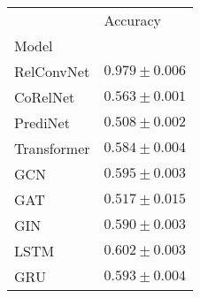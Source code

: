 \begin{tabular}{ll}
\toprule
{} &           Accuracy \\
Model       &                    \\
\midrule
RelConvNet  &  $0.979 \pm 0.006$ \\
CoRelNet    &  $0.563 \pm 0.001$ \\
PrediNet    &  $0.508 \pm 0.002$ \\
Transformer &  $0.584 \pm 0.004$ \\
GCN         &  $0.595 \pm 0.003$ \\
GAT         &  $0.517 \pm 0.015$ \\
GIN         &  $0.590 \pm 0.003$ \\
LSTM        &  $0.602 \pm 0.003$ \\
GRU         &  $0.593 \pm 0.004$ \\
\bottomrule
\end{tabular}
